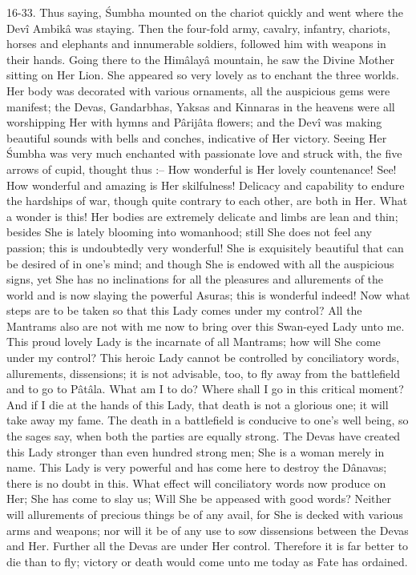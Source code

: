 16-33. Thus saying, \'Sumbha mounted on the chariot quickly and went where the Dev\^i Ambik\^a was staying. Then the four-fold army, cavalry, infantry, chariots, horses and elephants and innumerable soldiers, followed him with weapons in their hands. Going there to the Him\^alay\^a mountain, he saw the Divine Mother sitting on Her Lion. She appeared so very lovely as to enchant the three worlds. Her body was decorated with various ornaments, all the auspicious gems were manifest; the Devas, Gandarbhas, Yaksas and Kinnaras in the heavens were all worshipping Her with hymns and P\^arij\^ata flowers; and the Dev\^i was making beautiful sounds with bells and conches, indicative of Her victory. Seeing Her \'Sumbha was very much enchanted with passionate love and struck with, the five arrows of cupid, thought thus :-- How wonderful is Her lovely countenance! See! How wonderful and amazing is Her skilfulness! Delicacy and capability to endure the hardships of war, though quite contrary to each other, are both in Her. What a wonder is this! Her bodies are extremely delicate and limbs are lean and thin; besides She is lately blooming into womanhood; still She does not feel any passion; this is undoubtedly very wonderful! She is exquisitely beautiful that can be desired of in one's mind; and though She is endowed with all the auspicious signs, yet She has no inclinations for all the pleasures and allurements of the world and is now slaying the powerful Asuras; this is wonderful indeed! Now what steps are to be taken so that this Lady comes under my control? All the Mantrams also are not with me now to bring over this Swan-eyed Lady unto me. This proud lovely Lady is the incarnate of all Mantrams; how will She come under my control? This heroic Lady cannot be controlled by conciliatory words, allurements, dissensions; it is not advisable, too, to fly away from the battlefield and to go to P\^at\^ala. What am I to do? Where shall I go in this critical moment? And if I die at the hands of this Lady, that death is not a glorious one; it will take away my fame. The death in a battlefield is conducive to one's well being, so the sages say, when both the parties are equally strong. The Devas have created this Lady stronger than even hundred strong men; She is a woman merely in name. This Lady is very powerful and has come here to destroy the D\^anavas; there is no doubt in this. What effect will conciliatory words now produce on Her; She has come to slay us; Will She be appeased with good words? Neither will allurements of precious things be of any avail, for She is decked with various arms and weapons; nor will it be of any use to sow dissensions between the Devas and Her. Further all the Devas are under Her control. Therefore it is far better to die than to fly; victory or death would come unto me today as Fate has ordained.

